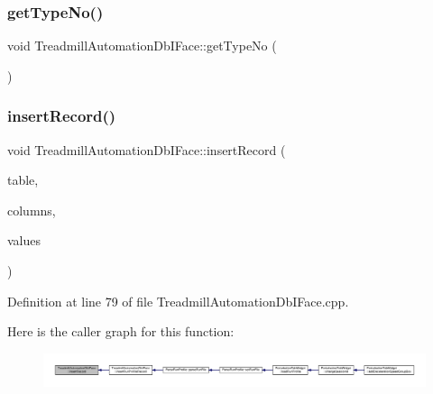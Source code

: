 \subsubsection{\texorpdfstring{get\+Type\+No()}{getTypeNo()}}
{\footnotesize\ttfamily void Treadmill\+Automation\+Db\+I\+Face\+::get\+Type\+No (\begin{DoxyParamCaption}{ }\end{DoxyParamCaption})}

\mbox{\label{class_treadmill_automation_db_i_face_a436c4be2c578db9455bfbcff484c9eb9}} 
\subsubsection{\texorpdfstring{insert\+Record()}{insertRecord()}}
{\footnotesize\ttfamily void Treadmill\+Automation\+Db\+I\+Face\+::insert\+Record (\begin{DoxyParamCaption}\item[{Q\+String}]{table,  }\item[{Q\+String}]{columns,  }\item[{Q\+String}]{values }\end{DoxyParamCaption})}



Definition at line 79 of file Treadmill\+Automation\+Db\+I\+Face.\+cpp.

Here is the caller graph for this function\+:
\nopagebreak
\begin{figure}[H]
\begin{center}
\leavevmode
\includegraphics[width=350pt]{class_treadmill_automation_db_i_face_a436c4be2c578db9455bfbcff484c9eb9_icgraph}
\end{center}
\end{figure}
\mbox{\label{class_treadmill_automation_db_i_face_a2810ac6e2cb938a04c66f64d83c90d5f}} 
